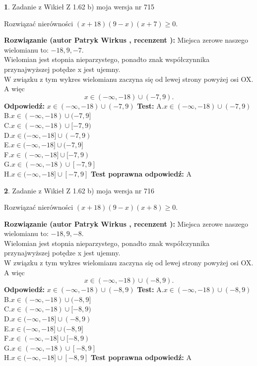 \documentclass[12pt, a4paper]{article}
\theoremstyle{definition} %
\newtheorem{zad}{}
\newcommand{\zadStart}[1]{\begin{zad}#1\newline}
\newcommand{\zadStop}{\end{zad}}
\newcommand{\rozwStart}[2]{\noindent \textbf{Rozwiązanie (autor #1 , recenzent #2): }\newline}
\newcommand{\rozwStop}{\newline}
\newcommand{\odpStart}{\noindent \textbf{Odpowiedź:}\newline}
\newcommand{\odpStop}{\newline}
\newcommand{\testStart}{\noindent \textbf{Test:}\newline}
\newcommand{\testStop}{\newline}
\newcommand{\kluczStart}{\noindent \textbf{Test poprawna odpowiedź:}\newline}
\newcommand{\kluczStop}{\newline}
\begin{document}
\zadStart{Zadanie z Wikieł Z 1.62 b) moja wersja nr 715}

Rozwiązać nierówności $(x+18)(9-x)(x+7)\ge0$.
\zadStop
\rozwStart{Patryk Wirkus}{}
Miejsca zerowe naszego wielomianu to: $-18, 9, -7$.\\
Wielomian jest stopnia nieparzystego, ponadto znak współczynnika przy\linebreak najwyższej potędze x jest ujemny.\\ W związku z tym wykres wielomianu zaczyna się od lewej strony powyżej osi OX. A więc $$x \in (-\infty,-18) \cup (-7,9).$$
\rozwStop
\odpStart
$x \in (-\infty,-18) \cup (-7,9)$
\odpStop
\testStart
A.$x \in (-\infty,-18) \cup (-7,9)$\\
B.$x \in (-\infty,-18) \cup (-7,9]$\\
C.$x \in (-\infty,-18) \cup [-7,9)$\\
D.$x \in (-\infty,-18] \cup (-7,9)$\\
E.$x \in (-\infty,-18] \cup (-7,9]$\\
F.$x \in (-\infty,-18] \cup [-7,9)$\\
G.$x \in (-\infty,-18) \cup [-7,9]$\\
H.$x \in (-\infty,-18] \cup [-7,9]$
\testStop
\kluczStart
A
\kluczStop



\zadStart{Zadanie z Wikieł Z 1.62 b) moja wersja nr 716}

Rozwiązać nierówności $(x+18)(9-x)(x+8)\ge0$.
\zadStop
\rozwStart{Patryk Wirkus}{}
Miejsca zerowe naszego wielomianu to: $-18, 9, -8$.\\
Wielomian jest stopnia nieparzystego, ponadto znak współczynnika przy\linebreak najwyższej potędze x jest ujemny.\\ W związku z tym wykres wielomianu zaczyna się od lewej strony powyżej osi OX. A więc $$x \in (-\infty,-18) \cup (-8,9).$$
\rozwStop
\odpStart
$x \in (-\infty,-18) \cup (-8,9)$
\odpStop
\testStart
A.$x \in (-\infty,-18) \cup (-8,9)$\\
B.$x \in (-\infty,-18) \cup (-8,9]$\\
C.$x \in (-\infty,-18) \cup [-8,9)$\\
D.$x \in (-\infty,-18] \cup (-8,9)$\\
E.$x \in (-\infty,-18] \cup (-8,9]$\\
F.$x \in (-\infty,-18] \cup [-8,9)$\\
G.$x \in (-\infty,-18) \cup [-8,9]$\\
H.$x \in (-\infty,-18] \cup [-8,9]$
\testStop
\kluczStart
A
\kluczStop
\end{document}
